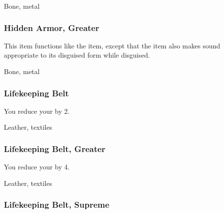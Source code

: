  


 Bone, metal


\lowercase{\hypertarget{item:Hidden Armor, Greater}{}}\label{item:Hidden Armor, Greater}
\hypertarget{item:Hidden Armor, Greater}{\subsubsection{Hidden Armor, Greater\hfill{}}}

This item functions like the  item, except that the item also makes sound appropriate to its disguised form while disguised.



 


 Bone, metal


\lowercase{\hypertarget{item:Lifekeeping Belt}{}}\label{item:Lifekeeping Belt}
\hypertarget{item:Lifekeeping Belt}{\subsubsection{Lifekeeping Belt\hfill{}}}

You reduce your  by 2.



 


 Leather, textiles


\lowercase{\hypertarget{item:Lifekeeping Belt, Greater}{}}\label{item:Lifekeeping Belt, Greater}
\hypertarget{item:Lifekeeping Belt, Greater}{\subsubsection{Lifekeeping Belt, Greater\hfill{}}}

You reduce your  by 4.



 


 Leather, textiles


\lowercase{\hypertarget{item:Lifekeeping Belt, Supreme}{}}\label{item:Lifekeeping Belt, Supreme}
\hypertarget{item:Lifekeeping Belt, Supreme}{\subsubsection{Lifekeeping Belt, Supreme\hfill{}}}

